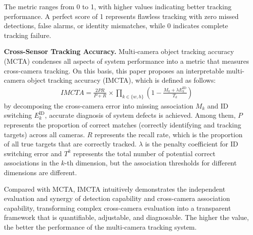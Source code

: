 \documentclass[lettersize,journal]{IEEEtran}
\begin{document}
The metric ranges from 0 to 1, with higher values indicating better tracking performance. 
A perfect score of 1 represents flawless tracking with zero missed detections, false alarms, or identity mismatches, while 0 indicates complete tracking failure.

\textbf{Cross-Sensor Tracking Accuracy.}
Multi-camera object tracking accuracy (MCTA)\cite{Alpher23b} condenses all aspects of system performance into a metric that measures cross-camera tracking.
On this basis, this paper proposes an interpretable multi-camera object tracking accuracy (IMCTA), which is defined as follows:
\begin{align}
	IMCTA = {\frac{2PR}{P + R}}_{\text{}} \times \prod_{k \in \{w, h\}} \left(1 - \frac{M_k + \lambda E_k^{\text{ID}}}{T_k}\right)
\end{align}
by decomposing the cross-camera error into missing association \(M_k\) and ID switching \(E_k^{\text{ID}}\), accurate diagnosis of system defects is achieved.
Among them,
\(P\) represents the proportion of correct matches (correctly identifying and tracking targets) across all cameras.  
\(R\) represents the recall rate, which is the proportion of all true targets that are correctly tracked.  
\(\lambda\) is the penalty coefficient for ID switching error and \(T^{k}\) represents the total number of potential correct associations in the \(k\)-th dimension, but the association thresholds for different dimensions are different.

Compared with MCTA, IMCTA intuitively demonstrates the independent evaluation and synergy of detection capability and cross-camera association capability, transforming complex cross-camera evaluation into a transparent framework that is quantifiable, adjustable, and diagnosable. 
The higher the value, the better the performance of the multi-camera tracking system.
\end{document}
